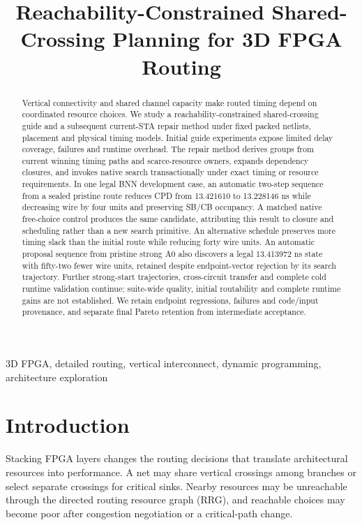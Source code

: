 \documentclass[conference,10pt]{IEEEtran}
\title{Reachability-Constrained Shared-Crossing Planning for 3D FPGA Routing}
\author{\IEEEauthorblockN{Anonymous submission draft}}
\begin{document}
\maketitle
\begin{abstract}
Vertical connectivity and shared channel capacity make routed timing depend on coordinated resource choices. We study a reachability-constrained shared-crossing guide and a subsequent current-STA repair method under fixed packed netlists, placement and physical timing models. Initial guide experiments expose limited delay coverage, failures and runtime overhead. The repair method derives groups from current winning timing paths and scarce-resource owners, expands dependency closures, and invokes native search transactionally under exact timing or resource requirements. In one legal BNN development case, an automatic two-step sequence from a sealed pristine route reduces CPD from 13.421610 to 13.228146 ns while decreasing wire by four units and preserving SB/CB occupancy. A matched native free-choice control produces the same candidate, attributing this result to closure and scheduling rather than a new search primitive. An alternative schedule preserves more timing slack than the initial route while reducing forty wire units. An automatic proposal sequence from pristine strong A0 also discovers a legal 13.413972 ns state with fifty-two fewer wire units, retained despite endpoint-vector rejection by its search trajectory. Further strong-start trajectories, cross-circuit transfer and complete cold runtime validation continue; suite-wide quality, initial routability and complete runtime gains are not established. We retain endpoint regressions, failures and code/input provenance, and separate final Pareto retention from intermediate acceptance.
\end{abstract}
\begin{IEEEkeywords}
3D FPGA, detailed routing, vertical interconnect, dynamic programming, architecture exploration
\end{IEEEkeywords}

\section{Introduction}
Stacking FPGA layers changes the routing decisions that translate architectural resources into performance. A net may share vertical crossings among branches or select separate crossings for critical sinks. Nearby resources may be unreachable through the directed routing resource graph (RRG), and reachable choices may become poor after congestion negotiation or a critical-path change.
\end{document}
